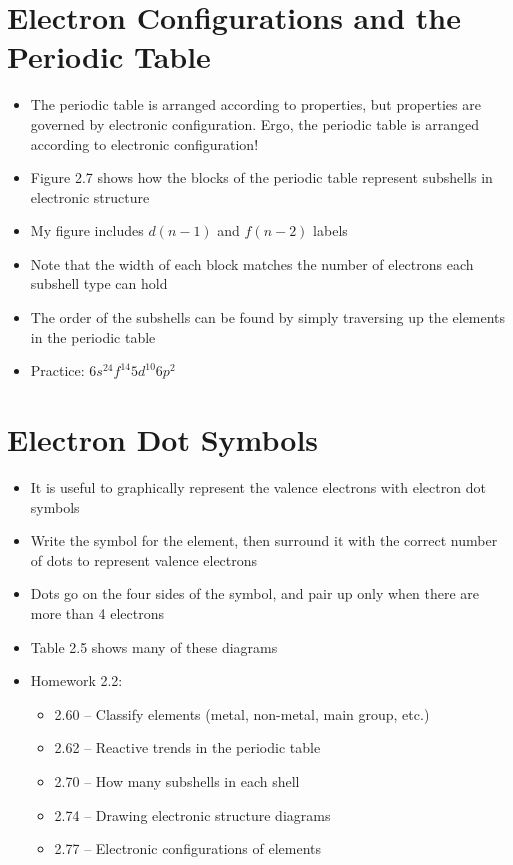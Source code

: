 \documentclass[12pt, openany, letterpaper]{memoir}
\begin{document}
\section{Electron Configurations and the Periodic Table}
\begin{itemize}
	\item The periodic table is arranged according to properties, but properties are governed by electronic configuration. Ergo, the periodic table is arranged according to electronic configuration!
	\item Figure 2.7 shows how the blocks of the periodic table represent subshells in electronic structure
	\item My figure includes $d(n-1)$ and $f(n-2)$ labels
	\item Note that the width of each block matches the number of electrons each subshell type can hold
	\item The order of the subshells can be found by simply traversing up the elements in the periodic table
	\item Practice: $6s^24f^{14}5d^{10}6p^2$
\end{itemize}
\section{Electron Dot Symbols}
\begin{itemize}
	\item It is useful to graphically represent the valence electrons with electron dot symbols
	\item Write the symbol for the element, then surround it with the correct number of dots to represent valence electrons
	\item Dots go on the four sides of the symbol, and pair up only when there are more than 4 electrons
	\item Table 2.5 shows many of these diagrams
	\item Homework 2.2:
	\begin{itemize}
		\item 2.60 -- Classify elements (metal, non-metal, main group, etc.)
		\item 2.62 -- Reactive trends in the periodic table
		\item 2.70 -- How many subshells in each shell
		\item 2.74 -- Drawing electronic structure diagrams
		\item 2.77 -- Electronic configurations of elements
	\end{itemize}
\end{itemize}
\end{document}
